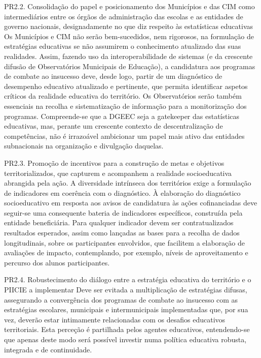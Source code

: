 \documentclass[
]{book}
\begin{document}
PR2.2. Consolidação do papel e posicionamento dos Municípios e das CIM como intermediários entre os órgãos de administração das escolas e as entidades de governo nacionais, designadamente no que diz respeito às estatísticas educativas
Os Municípios e CIM não serão bem-sucedidos, nem rigorosos, na formulação de estratégias educativas se não assumirem o conhecimento atualizado das suas realidades. Assim, fazendo uso da interoperabilidade de sistemas (e da crescente difusão de Observatórios Municipais de Educação), a candidatura aos programas de combate ao insucesso deve, desde logo, partir de um diagnóstico de desempenho educativo atualizado e pertinente, que permita identificar aspetos críticos da realidade educativa do território. Os Observatórios serão também essenciais na recolha e sistematização de informação para a monitorização dos programas.
Compreende-se que a DGEEC seja a gatekeeper das estatísticas educativas, mas, perante um crescente contexto de descentralização de competências, não é irrazoável ambicionar um papel mais ativo das entidades subnacionais na organização e divulgação daquelas.

PR2.3. Promoção de incentivos para a construção de metas e objetivos territorializados, que capturem e acompanhem a realidade socioeducativa abrangida pela ação.
A diversidade intrínseca dos territórios exige a formulação de indicadores em coerência com o diagnóstico. À elaboração do diagnóstico socioeducativo em resposta aos avisos de candidatura às ações cofinanciadas deve seguir-se uma consequente bateria de indicadores específicos, construída pela entidade beneficiária.
Para qualquer indicador devem ser contratualizados resultados esperados, assim como lançadas as bases para a recolha de dados longitudinais, sobre os participantes envolvidos, que facilitem a elaboração de avaliações de impacto, contemplando, por exemplo, níveis de aproveitamento e percurso dos alunos participantes.

PR2.4. Robustecimento do diálogo entre a estratégia educativa do território e o PIICIE a implementar
Deve ser evitada a multiplicação de estratégias difusas, assegurando a convergência dos programas de combate ao insucesso com as estratégias escolares, municipais e intermunicipais implementadas que, por sua vez, deverão estar intimamente relacionadas com os desafios educativos territoriais. Esta perceção é partilhada pelos agentes educativos, entendendo-se que apenas deste modo será possível investir numa política educativa robusta, integrada e de continuidade.
\end{document}
